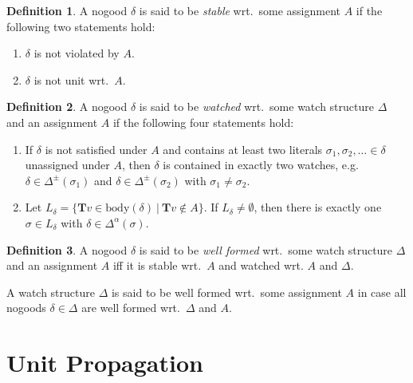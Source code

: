 \documentclass{vutinfth} %
\theoremstyle{example}
\theoremstyle{definition}
\newtheorem{definition}{Definition}[section]
\theoremstyle{theorem}
\theoremstyle{lemma}
\theoremstyle{corollary}
\newcommand{\ass}{A}
\newcommand{\bT}{\mathbf{T}}
\newcommand{\welf}{well formed\xspace}
\newcommand{\upinv}{stable\xspace}
\newcommand{\lowinv}{watched\xspace}
\newcommand{\bsgl}{\sigma}
\begin{document}
\begin{definition}
A nogood $\delta$ is said to be \emph{\upinv} wrt.~some assignment $\ass$ if the following two statements hold:

\begin{enumerate}
\item $\delta$ is not violated by $\ass$.
\item $\delta$ is not unit wrt.~$\ass$.
\end{enumerate}

\end{definition}

\begin{definition}

A nogood $\delta$ is said to be \emph{\lowinv} wrt.~some watch structure $\Delta$ and an assignment $\ass$ if the following four statements hold:

\begin{enumerate}
\item If $\delta$ is not satisfied under $\ass$ and contains at least two literals $\bsgl_1, \bsgl_2, \ldots \in \delta$ unassigned under $\ass$, then $\delta$ is contained in exactly two watches, e.g. $\delta \in \Delta^\pm(\bsgl_1)$ and $\delta \in \Delta^\pm(\bsgl_2)$ with $\bsgl_1 \not = \bsgl_2$.
\item Let $L_\delta = \{ \bT v \in \text{body}(\delta) \ | \ \bT v \not \in \ass \}$. If $L_\delta \not = \emptyset$, then there is exactly one $\bsgl \in L_\delta$ with $\delta \in \Delta^\alpha(\bsgl)$.
\end{enumerate}
\end{definition}

\begin{definition}
A nogood $\delta$ is said to be \emph{\welf} wrt.~some watch structure $\Delta$ and an assignment $\ass$ iff it is \upinv wrt.~$\ass$ and \lowinv wrt. $\ass$ and $\Delta$.
\end{definition}

A watch structure $\Delta$ is said to be \welf wrt.~some assignment $\ass$ in case all nogoods $\delta \in \Delta$ are well formed wrt.~$\Delta$ and $\ass$.

\section{Unit Propagation}
\end{document}

